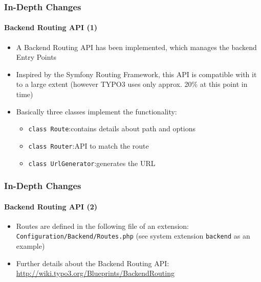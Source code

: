 \begin{frame}[fragile]
	\frametitle{In-Depth Changes}
	\framesubtitle{Backend Routing API (1)}

	\begin{itemize}
		\item A Backend Routing API has been implemented, which manages the backend Entry Points
		\item Inspired by the Symfony Routing Framework, this API is compatible with it to a large extent\newline
			\small(however TYPO3 uses only approx. 20\% at this point in time)\normalsize

		\item Basically three classes implement the functionality:
			\begin{itemize}
				\item \texttt{class Route}:\tabto{3.6cm}contains details about path and options
				\item \texttt{class Router}:\tabto{3.6cm}API to match the route
				\item \texttt{class UrlGenerator}:\tabto{3.6cm}generates the URL
			\end{itemize}
	\end{itemize}

\end{frame}

\begin{frame}[fragile]
	\frametitle{In-Depth Changes}
	\framesubtitle{Backend Routing API (2)}

	\begin{itemize}

		\item Routes are defined in the following file of an extension:
			\texttt{Configuration/Backend/Routes.php}\newline
			(see system extension \texttt{backend} as an example)

		\item Further details about the Backend Routing API:\newline
			\small\url{http://wiki.typo3.org/Blueprints/BackendRouting}\normalsize

	\end{itemize}

\end{frame}

